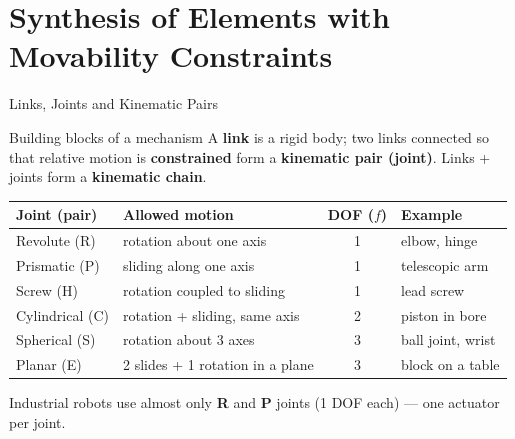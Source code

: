 \documentclass[aspectratio=169]{beamer}
\begin{document}
	\section{Synthesis of Elements with Movability Constraints}
	\begin{frame}{Links, Joints and Kinematic Pairs}
		\begin{block}{Building blocks of a mechanism}
			A \textbf{link} is a rigid body; two links connected so that relative motion is \textbf{constrained} form a \textbf{kinematic pair (joint)}. Links + joints form a \textbf{kinematic chain}.
		\end{block}
		\renewcommand{\arraystretch}{1.2}
		\centering
		\small
		\begin{tabular}{@{}llcl@{}}
			\toprule
			\textbf{Joint (pair)} & \textbf{Allowed motion} & \textbf{DOF ($f$)} & \textbf{Example} \\
			\midrule
			Revolute (R)    & rotation about one axis       & 1 & elbow, hinge \\
			Prismatic (P)   & sliding along one axis        & 1 & telescopic arm \\
			Screw (H)       & rotation coupled to sliding   & 1 & lead screw \\
			Cylindrical (C) & rotation + sliding, same axis & 2 & piston in bore \\
			Spherical (S)   & rotation about 3 axes         & 3 & ball joint, wrist \\
			Planar (E)      & 2 slides + 1 rotation in a plane & 3 & block on a table \\
			\bottomrule
		\end{tabular}
		\vspace{0.15cm}

		\footnotesize\centering Industrial robots use almost only \textbf{R} and \textbf{P} joints (1 DOF each) --- one actuator per joint.
	\end{frame}
\end{document}
